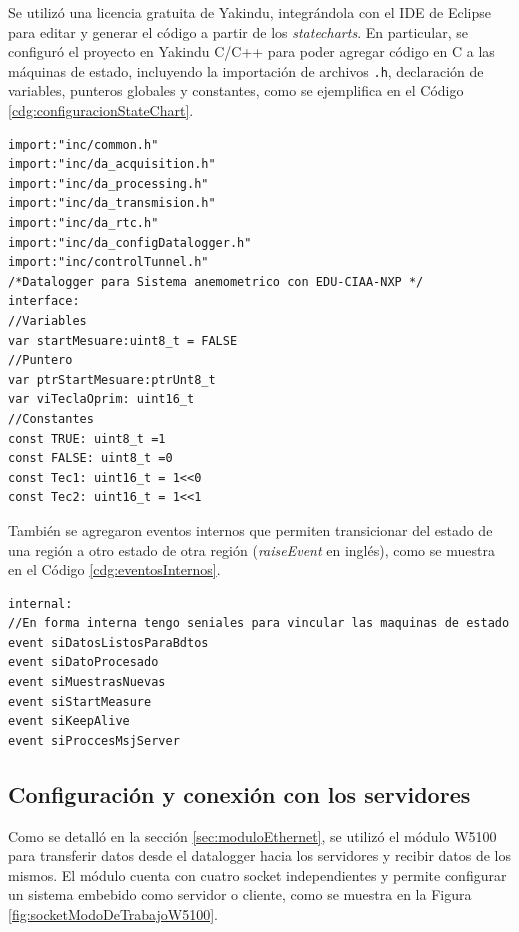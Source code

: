 Se utilizó una licencia gratuita de Yakindu, integrándola con el IDE de Eclipse para editar y generar el código a partir de los \textit{statecharts}. En particular, se configuró el proyecto en Yakindu C/C++ para poder agregar código en C a las máquinas de estado, incluyendo la importación de archivos \texttt{.h}, declaración de variables, punteros globales y constantes, como se ejemplifica en el Código \ref{cdg:configuracionStateChart}.


\begin{lstlisting}[style=yakindustyle, caption={Configuración principal del modelo statechart dataloggerSA.}, label=cdg:configuracionStateChart,basicstyle=\ttfamily\fontsize{8}{8}\selectfont] 
import:"inc/common.h"
import:"inc/da_acquisition.h"
import:"inc/da_processing.h"
import:"inc/da_transmision.h"
import:"inc/da_rtc.h"
import:"inc/da_configDatalogger.h"
import:"inc/controlTunnel.h"
/*Datalogger para Sistema anemometrico con EDU-CIAA-NXP */
interface:
//Variables
var startMesuare:uint8_t = FALSE
//Puntero
var ptrStartMesuare:ptrUnt8_t
var viTeclaOprim: uint16_t
//Constantes
const TRUE: uint8_t =1
const FALSE: uint8_t =0
const Tec1: uint16_t = 1<<0
const Tec2: uint16_t = 1<<1
\end{lstlisting}

 También se agregaron eventos internos que permiten transicionar del estado de una región a otro estado de otra región (\textit{raiseEvent} en inglés), como se muestra en el Código \ref{cdg:eventosInternos}.
\begin{lstlisting}[style=yakindustyle, caption={Declaración de eventos internos que permiten transicionar entre regiones del statechart.}, label=cdg:eventosInternos,basicstyle=\ttfamily\fontsize{8}{8}\selectfont]
internal:
//En forma interna tengo seniales para vincular las maquinas de estado
event siDatosListosParaBdtos
event siDatoProcesado
event siMuestrasNuevas
event siStartMeasure
event siKeepAlive
event siProccesMsjServer
\end{lstlisting}


\subsection{Configuración y conexión con los servidores}\label{sec:confServers}
Como se detalló en la sección \ref{sec:moduloEthernet}, se utilizó el módulo W5100 para transferir datos desde el datalogger hacia los servidores y recibir datos de los mismos. El módulo cuenta con cuatro socket independientes y permite configurar un sistema embebido como servidor o cliente, como se muestra en la Figura \ref{fig:socketModoDeTrabajoW5100}.

